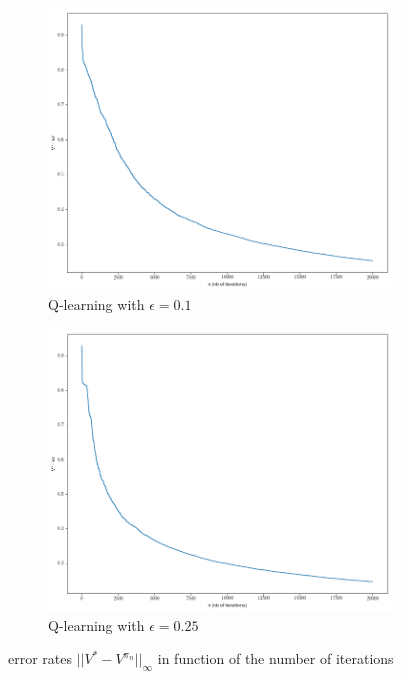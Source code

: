 \documentclass[11pt]{article}
\numberwithin{figure}{section} %
\begin{document}
\begin{figure}[H]
\centering
\begin{subfigure}{.5\textwidth}
  \centering
  \includegraphics[width=1\linewidth]{images/Ql01}
  \caption{Q-learning with $\epsilon = 0.1$}
  \label{fig:QL10}
\end{subfigure}%
\begin{subfigure}{.5\textwidth}
  \centering
  \includegraphics[width=1\linewidth]{images/Ql025}
  \caption{Q-learning with $\epsilon = 0.25$}
  \label{fig:QL25}
\end{subfigure}
\caption{error rates $||V^{*} - V^{\pi_n}||_{\infty}$ in function of the number of iterations}
\label{fig:Q_learning_error_rate}
\end{figure}
\end{document}
